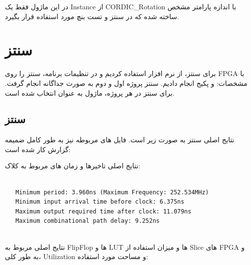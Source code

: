 \documentclass[12pt,titlepage,a4page , tikz , multi,table , svgnames,xcdraw]{article}
\begin{document}
در این ماژول فقط یک Instance از CORDIC\_Rotation با اندازه پارامتر مشخص ساخته شده که در سنتز و تست بنچ مورد استفاده قرار بگیرد.


\newpage


\section{سنتز}

برای سنتز، از نرم افزار  استفاده کردیم و در تنظیمات برنامه، سنتز را روی FPGA با مشخصات:  و پکیج  انجام دادیم. سنتز پروژه اول و دوم به صورت جداگانه انجام گرفت. برای سنتز در هر پروژه، ماژول  به عنوان  انتخاب شده است.

\subsection{سنتز }

نتایج اصلی سنتز به صورت زیر است. فایل های مربوطه نیز به طور کامل ضمیمه گزارش کار شده است:

نتایج اصلی تاخیرها و زمان های مربوط به کلاک:

\begin{latin}
\begin{verbatim}

   Minimum period: 3.960ns (Maximum Frequency: 252.534MHz)
   Minimum input arrival time before clock: 6.375ns
   Maximum output required time after clock: 11.079ns
   Maximum combinational path delay: 9.252ns


\end{verbatim}
\end{latin}


نتایج اصلی مربوط به FlipFlop ها و LUT ها و میزان استفاده از Slice های FPGA و به طور کلی، Utilization و مساحت مورد استفاده:
\end{document}
